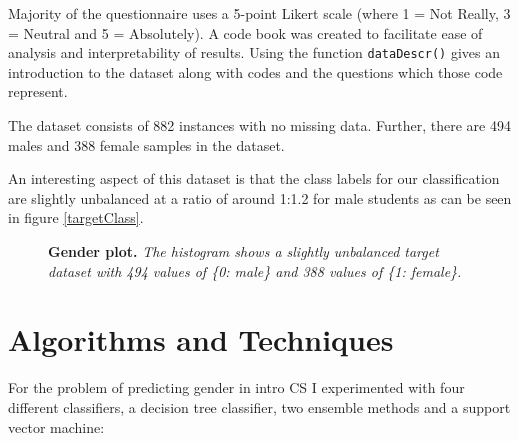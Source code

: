 Majority of the questionnaire uses a 5-point Likert scale (where 1 = Not Really, 3 = Neutral and 5 = Absolutely). A code book was created to facilitate ease of analysis and interpretability of results. Using the function \texttt{dataDescr()} gives an introduction to the dataset along with codes and the questions which those code represent. 

The dataset consists of 882 instances with no missing data. Further, there are 494 males and 388 female samples in the dataset.

An interesting aspect of this dataset is that the class labels for our classification are slightly unbalanced at a ratio of around 1:1.2 for male students as can be seen in figure \ref{targetClass}. 

\begin{figure}[!hbtp]
\centering
    
    \caption{\textbf{Gender plot. }\textit{The histogram shows a slightly unbalanced target dataset with 494 values of \{0: male\} and 388 values of \{1: female\}.}}
\end{figure}



\section*{Algorithms and Techniques}

For the problem of predicting gender in intro CS I experimented with four different classifiers, a decision tree classifier, two ensemble methods and a support vector machine:


